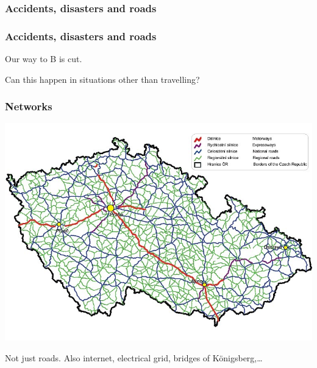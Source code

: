 \documentclass[10pt]{beamer}
\begin{document}
\begin{frame}
	\frametitle{Accidents, disasters and roads}
	\noindent{}
\end{frame}

\begin{frame}
	\frametitle{Accidents, disasters and roads}

	Our way to B is cut.

	\bigskip

	Can this happen in situations other than travelling?
\end{frame}

\begin{frame}
	\frametitle{Networks}
	\includegraphics[width=\textwidth]{images/road_network.jpg}

	Not just roads. Also internet, electrical grid, bridges of Königsberg,\ldots
\end{frame}
\end{document}
